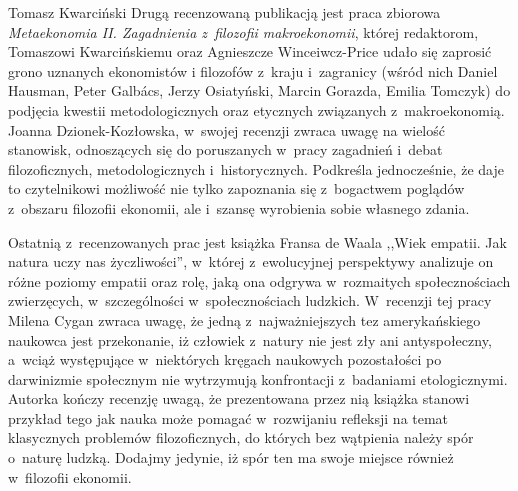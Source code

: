 \begin{editorial}{Tomasz Kwarciński}
Drugą recenzowaną publikacją jest praca zbiorowa \textit{Metaekonomia II. Zagadnienia z~filozofii makroekonomii}, której
redaktorom, Tomaszowi Kwarcińskiemu oraz Agnieszcze Winceiwcz-Price udało się zaprosić grono uznanych ekonomistów i
filozofów z~kraju i~zagranicy (wśród nich Daniel Hausman, Peter Galbács, Jerzy Osiatyński, Marcin Gorazda, Emilia Tomczyk)
do podjęcia
kwestii metodologicznych oraz etycznych związanych z~makroekonomią. Joanna Dzionek-Kozłowska, w~swojej recenzji zwraca
uwagę na
wielość stanowisk, odnoszących się do poruszanych w~pracy zagadnień i~debat filozoficznych,
metodologicznych i~historycznych. Podkreśla jednocześnie, że daje to czytelnikowi
możliwość nie tylko zapoznania się z~bogactwem poglądów z~obszaru filozofii ekonomii, ale i~szansę wyrobienia sobie własnego zdania.

Ostatnią z~recenzowanych prac jest książka Fransa de Waala ,,Wiek
empatii. Jak natura uczy nas życzliwości'', w~której z~ewolucyjnej
perspektywy analizuje on różne poziomy empatii oraz rolę, jaką ona
odgrywa w~rozmaitych społecznościach zwierzęcych, w~szczególności w~społecznościach
ludzkich. W~recenzji tej pracy Milena Cygan zwraca
uwagę, że jedną z~najważniejszych tez amerykańskiego naukowca jest
przekonanie, iż człowiek z~natury nie jest zły ani antyspołeczny, a~wciąż
występujące w~niektórych kręgach naukowych pozostałości po
darwinizmie społecznym nie wytrzymują konfrontacji z~badaniami
etologicznymi. Autorka kończy recenzję uwagą, że prezentowana
przez nią książka stanowi przykład tego jak nauka może pomagać w~rozwijaniu
refleksji na temat klasycznych problemów filozoficznych, do
których bez wątpienia należy spór o~naturę ludzką. Dodajmy jedynie, iż
spór ten ma swoje miejsce również w~filozofii ekonomii.

\end{editorial}